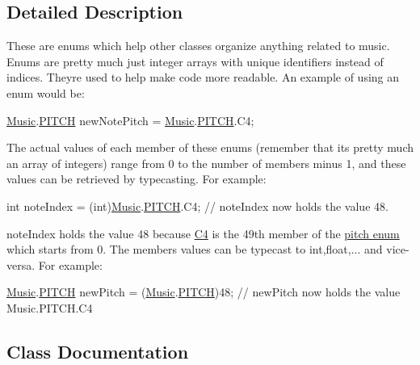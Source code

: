 \subsection{Detailed Description}
These are enums which help other classes organize anything related to music. Enums are pretty much just integer arrays with unique identifiers instead of indices. They\textquotesingle{}re used to help make code more readable. An example of using an enum would be\+:
\begin{DoxyCode}
\hyperlink{class_music}{Music}.\hyperlink{group___enums_ga508f69b199ea518f935486c990edac1d}{PITCH} newNotePitch = \hyperlink{class_music}{Music}.\hyperlink{group___enums_ga508f69b199ea518f935486c990edac1d}{PITCH}.C4; 
\end{DoxyCode}
 The actual values of each member of these enums (remember that it\textquotesingle{}s pretty much an array of integers) range from 0 to the number of members minus 1, and these values can be retrieved by typecasting. For example\+: 
\begin{DoxyCode}
\textcolor{keywordtype}{int} noteIndex = (int)\hyperlink{class_music}{Music}.\hyperlink{group___enums_ga508f69b199ea518f935486c990edac1d}{PITCH}.C4; \textcolor{comment}{// noteIndex now holds the value 48. }
\end{DoxyCode}
 note\+Index holds the value 48 because \hyperlink{}{C4} is the 49th member of the \hyperlink{group___enums_ga508f69b199ea518f935486c990edac1d}{pitch enum} which starts from 0. The members values can be typecast to int,float,... and vice-\/versa. For example\+: 
\begin{DoxyCode}
\hyperlink{class_music}{Music}.\hyperlink{group___enums_ga508f69b199ea518f935486c990edac1d}{PITCH} newPitch = (\hyperlink{class_music}{Music}.\hyperlink{group___enums_ga508f69b199ea518f935486c990edac1d}{PITCH})48; \textcolor{comment}{// newPitch now holds the value Music.PITCH.C4 }
\end{DoxyCode}
 

\subsection{Class Documentation}
\label{struct_music_1_1_melody_note}
